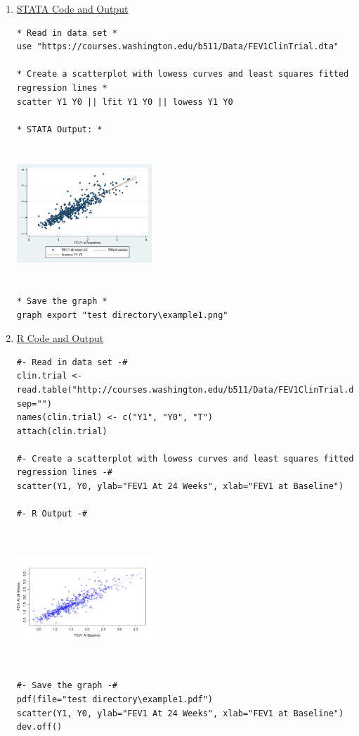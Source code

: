 \documentclass[11pt,letterpaper,fleqn]{report}
\begin{document}
\begin{enumerate}[]
\item \underline{STATA Code and Output}
{\scriptsize
\begin{verbatim}
* Read in data set *
use "https://courses.washington.edu/b511/Data/FEV1ClinTrial.dta"

* Create a scatterplot with lowess curves and least squares fitted regression lines *
scatter Y1 Y0 || lfit Y1 Y0 || lowess Y1 Y0

* STATA Output: *
\end{verbatim}}
\includegraphics[height=2in, width=2in]{fev1clintrial_lowess_scatter_example1_stata.png}
{\scriptsize
\begin{verbatim}
* Save the graph *
graph export "test directory\example1.png"
\end{verbatim}}
\item \underline{R Code and Output}
{\scriptsize
\begin{verbatim}
#- Read in data set -#
clin.trial <- read.table("http://courses.washington.edu/b511/Data/FEV1ClinTrial.dat", sep="")
names(clin.trial) <- c("Y1", "Y0", "T")
attach(clin.trial)

#- Create a scatterplot with lowess curves and least squares fitted regression lines -#
scatter(Y1, Y0, ylab="FEV1 At 24 Weeks", xlab="FEV1 at Baseline")

#- R Output -# 
\end{verbatim}}
\includegraphics[height=2in, width=2in]{fev1clintrial_lowess_scatter_example1_R.pdf}
{\scriptsize
\begin{verbatim}
#- Save the graph -#
pdf(file="test directory\example1.pdf")
scatter(Y1, Y0, ylab="FEV1 At 24 Weeks", xlab="FEV1 at Baseline")
dev.off()
\end{verbatim}}
\end{enumerate}
\end{document}
